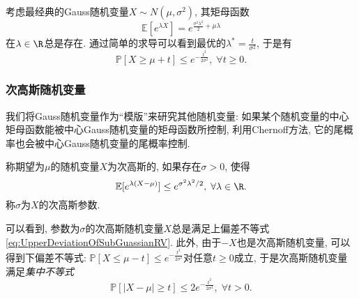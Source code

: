 \begin{example}[Gauss随机变量的上偏差不等式]
	考虑最经典的Gauss随机变量$X \sim N(\mu, \sigma^2)$, 其矩母函数
	\begin{equation}
		\mathbb{E}[e^{\lambda X}] = e^{\frac{\sigma^2 \lambda^2}{2} + \mu \lambda} 		
	\end{equation}
	在$\lambda \in \R$总是存在. 
	通过简单的求导可以看到最优的$\lambda^* = \frac{t}{\sigma^2}$, 于是有
	\begin{equation}\label{eq:UpperDeviationOfSubGuassianRV}
		\mathbb{P}[X \geq \mu + t] \leq e^{- \frac{t^2}{2 \sigma^2}},\; \forall t \geq 0. 
	\end{equation}
\end{example}

\subsubsection{次高斯随机变量}

我们将Gauss随机变量作为“模版”来研究其他随机变量: 如果某个随机变量的中心矩母函数能被中心Gauss随机变量的矩母函数所控制, 利用Chernoff方法, 它的尾概率也会被中心Gauss随机变量的尾概率控制. 

\begin{definition}[次高斯随机变量]
	称期望为$\mu$的随机变量$X$为次高斯的, 如果存在$\sigma > 0$, 使得
	\begin{equation*}
		\mathbb{E}[e^{\lambda(X - \mu)}] \leq e^{\sigma^2 \lambda^2 /2},\; \forall \lambda \in \R. 
	\end{equation*}
	称$\sigma$为$X$的次高斯参数. 
\end{definition}
可以看到, 参数为$\sigma$的次高斯随机变量$X$总是满足上偏差不等式 \eqref{eq:UpperDeviationOfSubGuassianRV}.  
此外, 由于$-X$也是次高斯随机变量, 可以得到下偏差不等式: $\mathbb{P}[X \leq \mu - t] \leq e^{- \frac{t^2}{2 \sigma^2}}$对任意$t \geq 0$成立, 于是次高斯随机变量满足\emph{集中不等式}
\begin{equation}\label{eq:SubGuassianConcentration}
	\mathbb{P}[|X - \mu| \geq t] \leq 2 e^{- \frac{t^2}{2 \sigma^2}},\; \forall t > 0. 
\end{equation}


